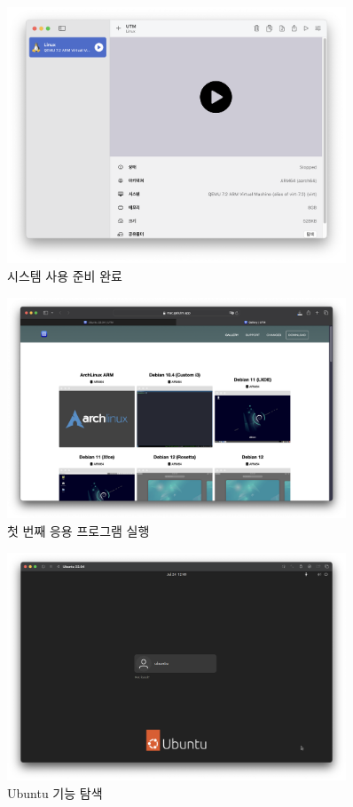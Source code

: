 \begin{figure}[htbp]
    \centering
    \includegraphics[width=0.9\textwidth]{images/chapter2Images/ch2_image_13.png}
    \caption{시스템 사용 준비 완료}
\end{figure}

\begin{figure}[htbp]
    \centering
    \includegraphics[width=0.9\textwidth]{images/chapter2Images/ch2_image_14.png}
    \caption{첫 번째 응용 프로그램 실행}
\end{figure}

\begin{figure}[htbp]
    \centering
    \includegraphics[width=0.9\textwidth]{images/chapter2Images/ch2_image_15.png}
    \caption{Ubuntu 기능 탐색}
\end{figure}

